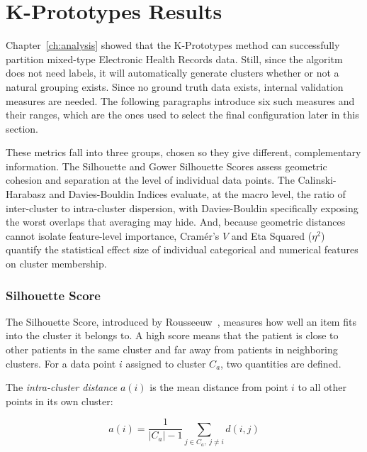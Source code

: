\section{K-Prototypes Results}
\label{ch:results_clustering}

Chapter~\ref{ch:analysis} showed that the K-Prototypes method can successfully partition mixed-type Electronic Health Records data. Still, since the algoritm does not need labels, it will automatically generate clusters whether or not a natural grouping exists. Since no ground truth data exists, internal validation measures are needed. The following paragraphs introduce six such measures and their ranges, which are the ones used to select the final configuration later in this section.

These metrics fall into three groups, chosen so they give different, complementary information. The Silhouette and Gower Silhouette Scores assess geometric cohesion and separation at the level of individual data points. The Calinski-Harabasz and Davies-Bouldin Indices evaluate, at the macro level, the ratio of inter-cluster to intra-cluster dispersion, with Davies-Bouldin specifically exposing the worst overlaps that averaging may hide. And, because geometric distances cannot isolate feature-level importance, Cramér's $V$ and Eta Squared ($\eta^2$) quantify the statistical effect size of individual categorical and numerical features on cluster membership.

\subsubsection*{Silhouette Score}

The Silhouette Score, introduced by Rousseeuw~\cite{rousseeuw1987}, measures how well an item fits into the cluster it belongs to. A high score means that the patient is close to other patients in the same cluster and far away from patients in neighboring clusters. For a data point $i$ assigned to cluster $C_a$, two quantities are defined.

\vspace{1em}

The \emph{intra-cluster distance} $a(i)$ is the mean distance from point $i$ to all other points in its own cluster:

\begin{equation}
    a(i) = \frac{1}{|C_a| - 1} \sum_{j \in C_a,\; j \neq i} d(i, j)
    \label{eq:silhouette_a}
\end{equation}

